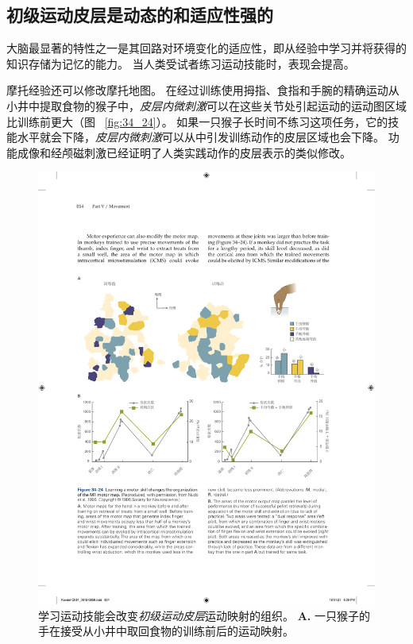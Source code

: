 \subsection{初级运动皮层是动态的和适应性强的}

大脑最显著的特性之一是其回路对环境变化的适应性，即从经验中学习并将获得的知识存储为记忆的能力。
当人类受试者练习运动技能时，表现会提高。


摩托经验还可以修改摩托地图。
在经过训练使用拇指、食指和手腕的精确运动从小井中提取食物的猴子中，\textit{皮层内微刺激}可以在这些关节处引起运动的运动图区域比训练前更大（图 ~\ref{fig:34_24}）。
如果一只猴子长时间不练习这项任务，它的技能水平就会下降，\textit{皮层内微刺激}可以从中引发训练动作的皮层区域也会下降。
功能成像和经颅磁刺激已经证明了人类实践动作的皮层表示的类似修改。


\begin{figure}[htbp]
	\centering
	\includegraphics[width=1.0\linewidth]{chap34/fig_34_24}
	\caption{学习运动技能会改变\textit{初级运动皮层}运动映射的组织\cite{nudo1996use}。
		\textbf{A.} 一只猴子的手在接受从小井中取回食物的训练前后的运动映射。
}
\end{figure}
